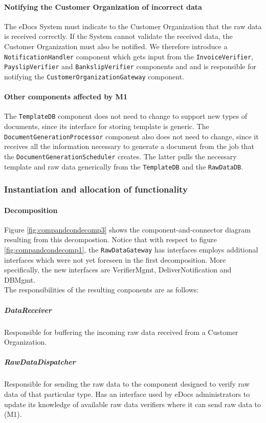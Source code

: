 \documentclass[a4paper,10pt]{article}
\begin{document}
\paragraph{Notifying the Customer Organization of incorrect data}
The eDocs System must indicate to the Customer Organization that the raw data is received correctly. If the System cannot validate the received data, the Customer Organization must also be notified. We therefore introduce a \texttt{NotificationHandler} component which gets input from the \texttt{InvoiceVerifier}, \texttt{PayslipVerifier} and \texttt{BankslipVerifier} components and and is responsible for notifying the \texttt{CustomerOrganizationGateway} component.

\paragraph{Other components affected by M1}
The \texttt{TemplateDB} component does not need to change to support new types of documents, since its interface for storing template is generic. The \texttt{DocumentGenerationProcessor} component also does not need to change, since it receives all the information necessary to generate a document from the job that the \texttt{DocumentGenerationScheduler} creates. The latter pulls the necessary template and raw data generically from the \texttt{TemplateDB} and the \texttt{RawDataDB}.
\subsubsection{Instantiation and allocation of functionality}
\paragraph{Decomposition}
Figure \ref{fig:compandcondecomp3} shows the component-and-connector diagram resulting from this decompostion. Notice that with respect to figure  \ref{fig:compandcondecomp1}, the \texttt{RawDataGateway} has interfaces employs additional interfaces which were not yet foreseen in the first decomposition. More specifically, the new interfaces are VerifierMgmt, DeliverNotification and DBMgmt.\\
The responsibilities of the resulting conponents are as follows:

\subparagraph{DataReceiver} Responsible for buffering the incoming raw data received from a Customer Organization.

\subparagraph{RawDataDispatcher} Responsible for sending the raw data to the component designed to verify raw data of that particular type. Has an interface used by eDocs administrators to update its knowledge of available raw data verifiers where it can send raw data to (M1).
\end{document}
